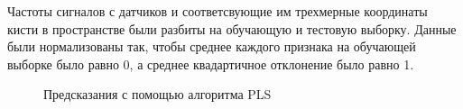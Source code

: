 \documentclass[12pt,twoside]{article}
\begin{document}
Частоты сигналов с датчиков и соответсвующие им трехмерные координаты кисти в пространстве были разбиты на обучающую и тестовую выборку. Данные были нормализованы так, чтобы среднее каждого признака на обучающей выборке было равно 0, а среднее квадартичное отклонение было равно 1. 

\begin{figure}[h]
\begin{minipage}[h]{0.49\linewidth}
\caption{Предсказания с помощью алгоритма PLS}
\label{fig:pls_basic}
\end{minipage}
\hfill
\begin{minipage}[h]{0.49\linewidth}

\end{minipage}
\end{figure}
\end{document}
